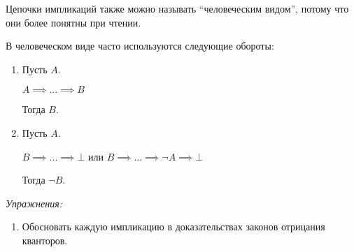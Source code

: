 Цепочки импликаций также можно называть ``человеческим видом'', потому что они более
понятны при чтении.

В человеческом виде часто используются следующие обороты:
\begin{enumerate}
	\item{}
	Пусть $A$.

	$A\implies ...\implies B$

	Тогда $B$.
	\item{}
	Пусть $A$.

	$B\implies ...\implies \bot$ или $B\implies ...\implies \lnot A\implies\bot$

	Тогда $\lnot B$.
\end{enumerate}

{\it Упражнения:}
\begin{enumerate}
	\item{}Обосновать каждую импликацию в доказательствах законов отрицания кванторов.
\end{enumerate}

\pagebreak
